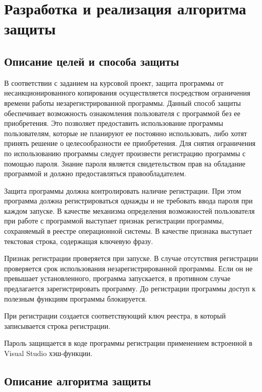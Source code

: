 
\section{Разработка и реализация алгоритма защиты}
\label{sec:--1}

\subsection{Описание целей и способа защиты}
\label{subsec:--1}

В соответствии с заданием на курсовой проект, защита программы от
несанкционированного копирования осуществляется посредством
ограничения времени работы незарегистрированной программы. Данный
способ защиты обеспечивает возможность ознакомления пользователя с
программой без ее приобретения. Это позволяет предоставить
использование программы пользователям, которые не планируют ее
постоянно использовать, либо хотят принять решение о
целесообразности ее приобретения. Для снятия ограничения по
использованию программы следует произвести регистрацию программы с
помощью пароля. Знание пароля является свидетельством прав на
обладание программой и должно предоставляться правообладателем.

Защита программы должна контролировать наличие регистрации. При этом
программа должна регистрироваться однажды и не требовать ввода пароля
при каждом запуске.  В качестве механизма определения возможностей
пользователя при работе с программой выступает признак регистрации
программы, сохраняемый в реестре операционной системы. В качестве
признака выступает текстовая строка, содержащая ключевую фразу.

Признак регистрации проверяется при запуске. В случае отсутствия
регистрации проверяется срок использования незарегистрированной
программы. Если он не превышает установленного, программа запускается,
в противном случае предлагается зарегистрировать программу. До
регистрации программы доступ к полезным функциям программы
блокируется.

При регистрации создается соответствующий ключ реестра, в который
записывается строка регистрации.

Пароль защищается в коде программы регистрации применением встроенной
в Visual Studio хэш-функции.

\subsection{Описание алгоритма защиты}
\label{subsec:--2}

